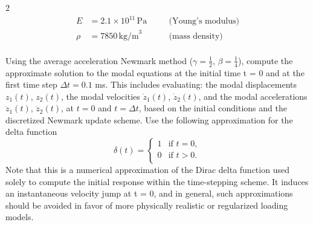 \documentclass[12pt]{article}
\begin{document}
\begin{enumerate}
\begin{multicols}{2}
          \[
            \begin{aligned}
              E    & = 2.1 \times 10^{11} \, \text{Pa} \quad &  & \text{(Young's modulus)} \\
              \rho & = 7850 \, \text{kg/m}^3 \quad           &  & \text{(mass density)}    \\
            \end{aligned}
          \]
        \end{multicols}
        Using the average acceleration Newmark method ($\gamma = \frac{1}{2}, \, \beta = \frac{1}{4}$), compute the approximate solution to the modal equations at the initial time t = 0 and at the first time step $\Delta t = 0.1$ ms. This includes evaluating: the modal displacements $z_1(t)$, $z_2(t)$, the modal velocities $\dot{z}_1(t)$, $\dot{z}_2(t)$, and  the modal accelerations $\ddot{z}_1(t)$, $\ddot{z}_2(t)$,
        at $t = 0$ and $t = \Delta t$, based on the initial conditions and the discretized Newmark update scheme. Use the following approximation for the delta function
        $$\delta(t)=\begin{cases}
            1 & \text{if } t=0, \\
            0 & \text{if } t>0. \\
          \end{cases}$$
        Note that this is a numerical approximation of the Dirac delta function used solely to compute the initial response within the time-stepping scheme. It induces an instantaneous velocity jump at t = 0, and in general, such approximations should be avoided in favor of more physically realistic or regularized loading models.
\end{enumerate}
\end{document}
